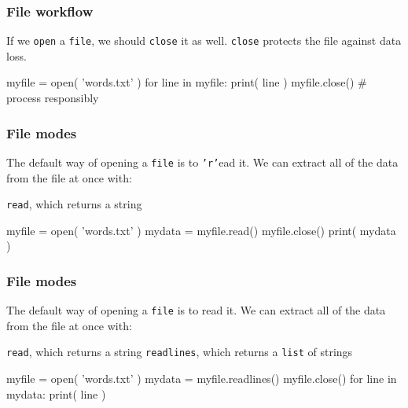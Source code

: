 \documentclass[11pt]{beamer}
\begin{document}
\begin{frame}[fragile]
  \frametitle{File workflow}
  \Enlarge

  \begin{itemize}
  \myitem  If we \texttt{open} a  \texttt{file}, we should \texttt{close} it as well. %
  \myitem  \texttt{close} protects the file against data loss. %
  \end{itemize}
  \begin{semiverbatim}
myfile = open( 'words.txt' )
for line in myfile:
    print( line )
myfile.close()  # process responsibly
  \end{semiverbatim}
\end{frame}

\begin{frame}[fragile]
  \frametitle{File modes}
  \Enlarge

  \begin{itemize}
  \myitem  The default way of opening a \texttt{file} is to \texttt{'r'}ead it. %
  \myitem  We can extract all of the data from the file at once with:
    \begin{itemize}
    \mysubitem  \texttt{read}, which returns a string
    \end{itemize}
  \end{itemize}
  \begin{semiverbatim}
myfile = open( 'words.txt' )
mydata = myfile.read()
myfile.close()
print( mydata )
  \end{semiverbatim}
\end{frame}

\begin{frame}[fragile]
  \frametitle{File modes}
  \Enlarge

  \begin{itemize}
  \myitem  The default way of opening a \texttt{file} is to read it.
  \myitem  We can extract all of the data from the file at once with:
    \begin{itemize}
    \mysubitem  \texttt{read}, which returns a string
    \mysubitem  \texttt{readlines}, which returns a \texttt{list} of strings
    \end{itemize}
  \end{itemize}
  \begin{semiverbatim}
myfile = open( 'words.txt' )
mydata = myfile.readlines()
myfile.close()
for line in mydata:
    print( line )
  \end{semiverbatim}
\end{frame}
\end{document}
